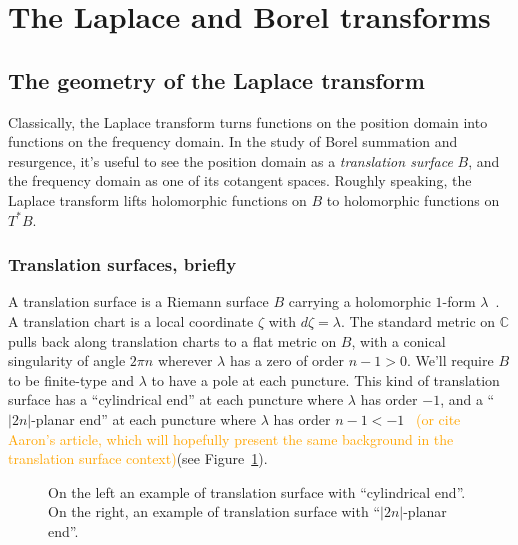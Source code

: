 \documentclass{article}
\newcommand{\C}{\mathbb{C}}
\theoremstyle{definition}
\theoremstyle{plain}
\begin{document}
\section{The Laplace and Borel transforms}\label{sec:Laplace-Borel-general}
\subsection{The geometry of the Laplace transform}
Classically, the Laplace transform turns functions on the position domain into functions on the frequency domain. In the study of Borel summation and resurgence, it's useful to see the position domain as a {\em translation surface} $B$, and the frequency domain as one of its cotangent spaces. Roughly speaking, the Laplace transform lifts holomorphic functions on $B$ to holomorphic functions on $T^*B$.
%
\subsubsection{Translation surfaces, briefly}
%
A translation surface is a Riemann surface $B$ carrying a holomorphic $1$-form $\lambda$~\cite{zorich2006flat}. A translation chart is a local coordinate $\zeta$ with $d\zeta = \lambda$. The standard metric on $\C$ pulls back along translation charts to a flat metric on $B$, with a conical singularity of angle $2\pi n$ wherever $\lambda$ has a zero of order $n-1 > 0$. We'll require $B$ to be finite-type and $\lambda$ to have a pole at each puncture. This kind of translation surface has a ``cylindrical end'' at each puncture where $\lambda$ has order $-1$, and a ``$|2n|$-planar end'' at each puncture where $\lambda$ has order $n-1 < -1$~\cite[Section 2.5]{gupta2013meromorphic} \textcolor{orange}{(or cite Aaron's article, which will hopefully present the same background in the translation surface context)}(see Figure~\ref{fig:translation_surface}).
\begin{figure}[ht]
    \centering
    \caption{On the left an example of translation surface with ``cylindrical end''. On the right, an example of translation surface with  ``$|2n|$-planar end''. }
    \label{fig:translation_surface}
\end{figure}
%
\end{document}
